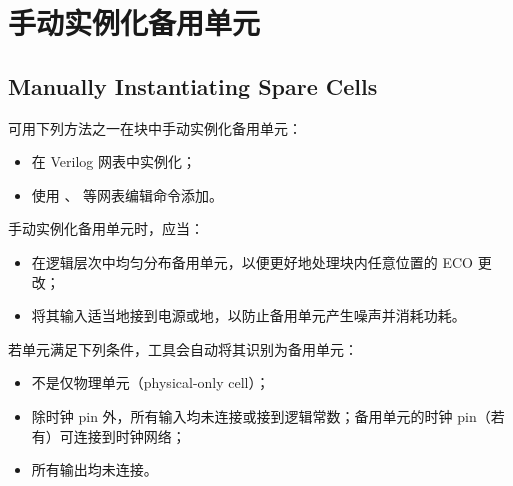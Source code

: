 \section{手动实例化备用单元}
\subsection*{Manually Instantiating Spare Cells}

可用下列方法之一在块中手动实例化备用单元：
\begin{itemize}
  \item 在 Verilog 网表中实例化；
  \item 使用 、 等网表编辑命令添加。
\end{itemize}

手动实例化备用单元时，应当：
\begin{itemize}
  \item 在逻辑层次中均匀分布备用单元，以便更好地处理块内任意位置的 ECO 更改；
  \item 将其输入适当地接到电源或地，以防止备用单元产生噪声并消耗功耗。
\end{itemize}

若单元满足下列条件，工具会自动将其识别为备用单元：
\begin{itemize}
  \item 不是仅物理单元（physical-only cell）；
  \item 除时钟 pin 外，所有输入均未连接或接到逻辑常数；备用单元的时钟 pin（若有）可连接到时钟网络；
  \item 所有输出均未连接。
\end{itemize}

